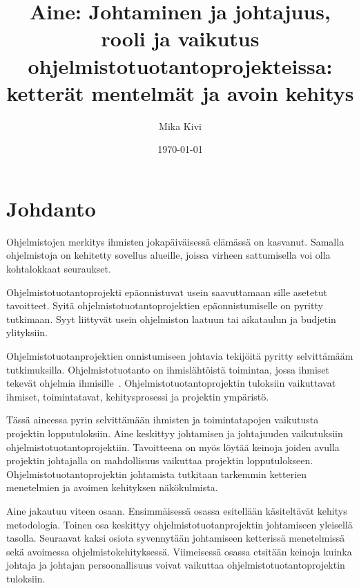 \documentclass[finnish]{tktltiki2}
\title{Aine: Johtaminen ja johtajuus, rooli ja vaikutus ohjelmistotuotantoprojekteissa: ketterät mentelmät ja avoin kehitys}
\author{Mika Kivi}
\date{\today}
\theoremstyle{definition}
\theoremstyle{remark}
\begin{document}

\maketitle        %
\makeabstract     %

\tableofcontents  %
\newpage          %



\section{Johdanto}

Ohjelmistojen merkitys ihmisten jokapäiväisessä elämässä on kasvanut. Samalla ohjelmistoja on kehitetty sovellus alueille, joissa virheen sattumisella voi olla kohtalokkaat seuraukset.

Ohjelmistotuotantoprojekti epäonnistuvat usein saavuttamaan sille asetetut tavoitteet. Syitä ohjelmistotuotantoprojektien epäonnistumiselle on pyritty tutkimaan. Syyt liittyvät usein ohjelmiston laatuun tai aikataulun ja budjetin ylityksiin.

Ohjelmistotuotanprojektien onnistumiseen johtavia tekijöitä pyritty selvittämääm tutkimuksilla. Ohjelmistotuotanto on ihmislähtöistä toimintaa, jossa ihmiset tekevät ohjelmia ihmisille~\cite{Wang:2010:PPP:1810295.1810302}. Ohjelmistotuotantoprojektin tuloksiin vaikuttavat ihmiset, toimintatavat, kehitysprosessi ja projektin ympäristö. 

Tässä aineessa pyrin selvittämään ihmisten ja toimintatapojen vaikutusta projektin lopputuloksiin. Aine keskittyy johtamisen ja johtajuuden vaikutuksiin ohjelmistotuotantoprojektiin. Tavoitteena on myös löytää keinoja joiden avulla projektin johtajalla on mahdollisuus vaikuttaa projektin lopputulokseen. Ohjelmistotuotantoprojektin johtamista tutkitaan tarkemmin ketterien menetelmien ja avoimen kehityksen näkökulmista.

Aine jakautuu viteen osaan. Ensimmäisessä osassa esitellään käsiteltävät kehitys metodologia. Toinen osa keskittyy ohjelmistotuotanprojektin johtamiseen yleisellä tasolla. Seuraavat kaksi osiota syvennytään johtamiseen ketterissä menetelmissä sekä avoimessa ohjelmistokehityksessä. Viimeisessä osassa etsitään keinoja kuinka johtaja ja johtajan persoonallisuus voivat vaikuttaa ohjelmistotuotantoprojektin tuloksiin.
  
\end{document}
